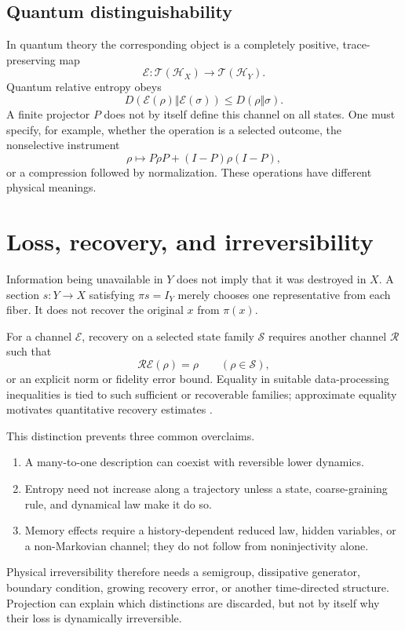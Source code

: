 \documentclass[11pt]{article}
\begin{document}
\subsection{Quantum distinguishability}

In quantum theory the corresponding object is a completely positive,
trace-preserving map
\[
 \mathcal E:\mathcal T(\mathcal H_X)\longrightarrow
 \mathcal T(\mathcal H_Y).
\]
Quantum relative entropy obeys
\[
 D(\mathcal E(\rho)\Vert\mathcal E(\sigma))
 \leq D(\rho\Vert\sigma).
\]
A finite projector \(P\) does not by itself define this channel on all
states. One must specify, for example, whether the operation is a selected
outcome, the nonselective instrument
\[
 \rho\longmapsto P\rho P+(I-P)\rho(I-P),
\]
or a compression followed by normalization. These operations have
different physical meanings.

\section{Loss, recovery, and irreversibility}

Information being unavailable in \(Y\) does not imply that it was destroyed
in \(X\). A section \(s:Y\to X\) satisfying \(\pi s=I_Y\) merely chooses one
representative from each fiber. It does not recover the original \(x\) from
\(\pi(x)\).

For a channel \(\mathcal E\), recovery on a selected state family
\(\mathcal S\) requires another channel \(\mathcal R\) such that
\[
 \mathcal R\mathcal E(\rho)=\rho
 \qquad(\rho\in\mathcal S),
\]
or an explicit norm or fidelity error bound. Equality in suitable
data-processing inequalities is tied to such sufficient or recoverable
families; approximate equality motivates quantitative recovery estimates
\cite{Petz1986,Sutter2016}.

This distinction prevents three common overclaims.
\begin{enumerate}[leftmargin=*]
\item A many-to-one description can coexist with reversible lower dynamics.
\item Entropy need not increase along a trajectory unless a state,
coarse-graining rule, and dynamical law make it do so.
\item Memory effects require a history-dependent reduced law, hidden
variables, or a non-Markovian channel; they do not follow from
noninjectivity alone.
\end{enumerate}

Physical irreversibility therefore needs a semigroup, dissipative
generator, boundary condition, growing recovery error, or another
time-directed structure. Projection can explain which distinctions are
discarded, but not by itself why their loss is dynamically irreversible.
\end{document}
